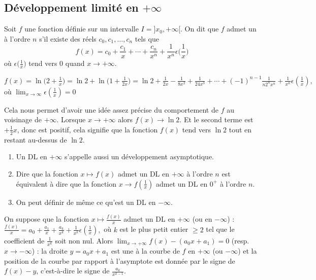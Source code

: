 \documentclass[class=report,crop=false]{standalone}
\begin{document}
\subsection{Développement limité en $+\infty$}

Soit $f$ une fonction définie sur un intervalle $I = ]x_0,+\infty[$.
On dit que $f$ admet un  à l'ordre $n$
s'il existe des réels $c_0,c_1,\ldots,c_n$ tels que
$$f(x)=c_0+\frac{c_1}{x}+\cdots+\frac{c_n}{x^n}
+\frac{1}{x^n}\epsilon\big(\frac{1}{x}\big)$$
où $\epsilon\big(\frac{1}{x}\big)$ tend vers $0$ quand $x\to+\infty$.

\begin{exemple}
$f(x)=\ln\big(2+\frac{1}{x}\big)=\ln2+\ln\big(1+\frac{1}{2x}\big)
=\ln2+\frac{1}{2x}-\frac{1}{8x^2}+\frac{1}{24x^3}+\cdots
+(-1)^{n-1}\frac{1}{n2^nx^n} +\frac{1}{x^{n}}\epsilon(\frac{1}{x}),$
où $\lim_{x\to\infty}\epsilon(\frac{1}{x})=0$


Cela nous permet d'avoir une idée assez précise du comportement de $f$ au voisinage de $+\infty$.
Lorsque $x\to +\infty$ alors $f(x)\to \ln2$.
Et le second terme est $+\frac 12x$, donc est positif, cela signifie
que la fonction $f(x)$ tend vers $\ln 2$ tout en restant au-dessus de $\ln 2$.
\end{exemple}


\begin{remarque*}
\sauteligne
\begin{enumerate}
  \item Un DL en $+\infty$ s'appelle aussi un développement asymptotique.
  \item Dire que la fonction $x \mapsto f(x)$ admet un DL en $+\infty$ à l'ordre $n$ est équivalent à
dire que la fonction $x \to f(\frac{1}{x})$ admet un DL en $0^+$ à l'ordre $n$.
  \item On peut définir de même ce qu'est un DL en $-\infty$.
\end{enumerate}
\end{remarque*}


\begin{proposition}
On suppose que la fonction $x\mapsto\frac{f(x)}{x}$
admet un DL en $+\infty$ (ou en $-\infty$) :
$\frac{f(x)}{x}= a_0 +\frac{a_1}{x}+\frac{a_k}{x^k}+\frac{1}{x^k}\epsilon(\frac{1}{x}),$
où $k$ est
le plus petit entier $\ge 2$ tel que le coefficient de  $\frac{1}{x^k}$ soit
non nul.
Alors $\lim_{x\to+\infty} f(x)-(a_0x+a_1) =0$ (resp. $x\to -\infty$) : la droite $y= a_0x+a_1$ est une 
à la courbe de $f$ en $+\infty$ (ou $-\infty$) et la position de la courbe par rapport à
l'asymptote est donnée par le signe de $f(x)-y$, c'est-à-dire le signe de $\frac{a_k}{x^{k-1}}$.
\end{proposition}
\end{document}
